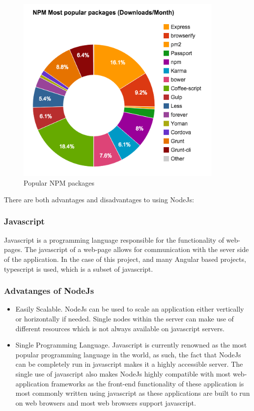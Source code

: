 \begin{figure}[h!]
    	\caption{Popular NPM packages}
	\centering
	\includegraphics[width=0.9\textwidth]{images/npm.png}
\end{figure}

There are both advantages and disadvantages to using NodeJs\cite{advdis2}: \\

\subsubsection{Javascript}
Javascript is a programming language responsible for the functionality of web-pages. The javascript of a web-page allows for communication with the sever side of the application. In the case of this project, and many Angular based projects, typescript is used, which is a subset of javascript\cite{jsdocs}.

\subsubsection{Advatanges of NodeJs}
\begin{itemize}
    \item Easily Scalable. NodeJs can be used to scale an application either vertically or horizontally if needed. Single nodes within the server can make use of different resources which is not always available on javascript servers.
    \item Single Programming Language. Javascript is currently renowned as the most popular programming language in the world, as such, the fact that NodeJs can be completely run in javascript makes it a highly accessible server. The single use of javascript also makes NodeJs highly compatible with most web-application frameworks as the front-end functionality of these application is most commonly written using javascript as these applications are built to run on web browsers and most web browsers support javascript.
\end{itemize}

